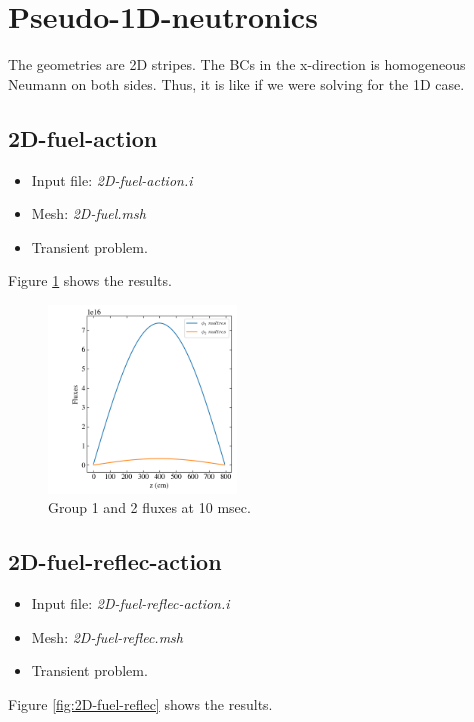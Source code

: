 \documentclass[11pt,letterpaper]{article}
\begin{document}
\section{Pseudo-1D-neutronics}

The geometries are 2D stripes.
The BCs in the x-direction is homogeneous Neumann on both sides.
Thus, it is like if we were solving for the 1D case.

\subsection{2D-fuel-action}

	\begin{itemize}
		\item Input file: \textit{2D-fuel-action.i}
		\item Mesh: \textit{2D-fuel.msh}
		\item Transient problem.
	\end{itemize}

Figure \ref{fig:2D-fuel-action} shows the results.

	\begin{figure}[htbp!]
		\centering
		\includegraphics[height=5cm]{2D-fuel-action}
		\caption{Group 1 and 2 fluxes at 10 msec.}
		\label{fig:2D-fuel-action}
	\end{figure}

\subsection{2D-fuel-reflec-action}

	\begin{itemize}
		\item Input file: \textit{2D-fuel-reflec-action.i}
		\item Mesh: \textit{2D-fuel-reflec.msh}
		\item Transient problem.
	\end{itemize}

Figure \ref{fig:2D-fuel-reflec} shows the results.
\end{document}
